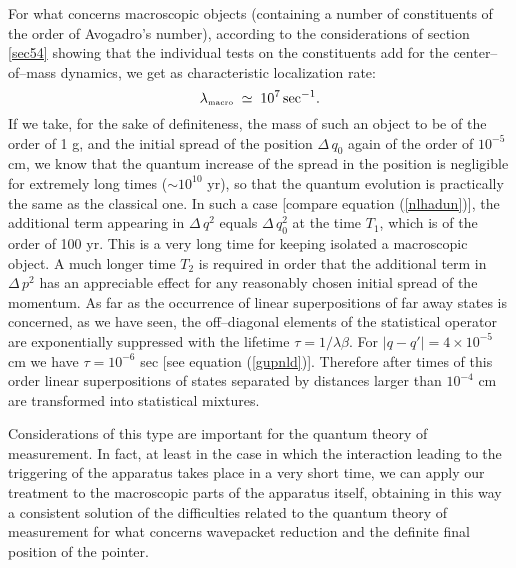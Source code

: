 \documentclass[12pt]{article}
\begin{document}
For what concerns macroscopic objects (containing a number of
constituents of the order of Avogadro's number), according to the
considerations of section \ref{sec54} showing that the individual
tests on the constituents add for the center--of--mass dynamics,
we get as characteristic localization rate:
\begin{equation}
\lambda_{\makebox{\tiny macro}} \; \simeq \; 10^{7}\,
\makebox{sec}^{-1}.
\end{equation}
If we take, for the sake of definiteness, the mass of such an
object to be of the order of 1 g, and the initial spread of the
position $\Delta\,q_{0}$ again of the order of $10^{-5}$ cm, we
know that the quantum increase of the spread in the position is
negligible for extremely long times ($\sim 10^{10}$ yr), so that
the quantum evolution is practically the same as the classical
one. In such a case [compare equation (\ref{nlhadun})], the
additional term appearing in $\Delta\, q^{2}$ equals $\Delta\,
q_{0}^{2}$ at the time $T_{1}$, which is of the order of 100 yr.
This is a very long time for keeping isolated a macroscopic
object. A much longer time $T_{2}$ is required in order that the
additional term in $\Delta\, p^{2}$ has an appreciable effect for
any reasonably chosen initial spread of the momentum. As far as
the occurrence of linear superpositions of far away states is
concerned, as we have seen, the off--diagonal elements of the
statistical operator are exponentially suppressed with the
lifetime $\tau = 1/\lambda\beta$. For $|q - q'| = 4\times 10^{-5}$
cm we have $\tau = 10^{-6}$ sec [see equation (\ref{gupnld})].
Therefore after times of this order linear superpositions of
states separated by distances larger than $10^{-4}$ cm are
transformed into statistical mixtures.

Considerations of this type are important for the quantum theory
of measurement. In fact, at least in the case in which the
interaction leading to the triggering of the apparatus takes place
in a very short time, we can apply our treatment to the
macroscopic parts of the apparatus itself, obtaining in this way a
consistent solution of the difficulties related to the quantum
theory of measurement for what concerns wavepacket reduction and
the definite final position of the pointer.
\end{document}
